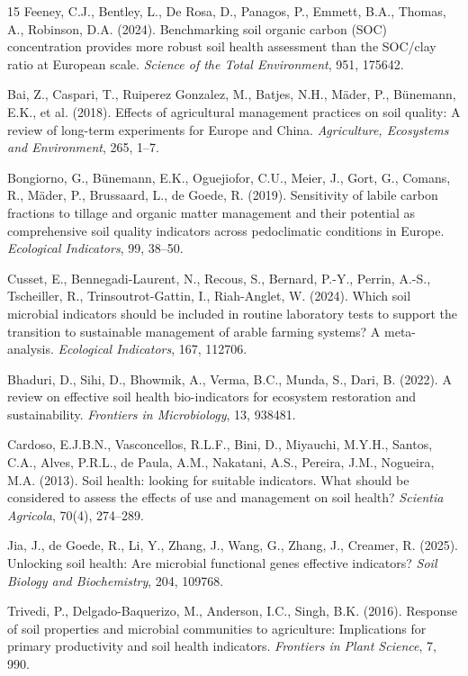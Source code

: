 \documentclass[11pt,a4paper]{article}
\begin{document}
\begin{thebibliography}{15}
Feeney, C.J., Bentley, L., De Rosa, D., Panagos, P., Emmett, B.A., Thomas, A.,
Robinson, D.A. (2024). Benchmarking soil organic carbon (SOC) concentration
provides more robust soil health assessment than the SOC/clay ratio at European
scale. \emph{Science of the Total Environment}, 951, 175642.

Bai, Z., Caspari, T., Ruiperez Gonzalez, M., Batjes, N.H., Mäder, P.,
Bünemann, E.K., et al. (2018). Effects of agricultural management practices on
soil quality: A review of long-term experiments for Europe and China.
\emph{Agriculture, Ecosystems and Environment}, 265, 1--7.

Bongiorno, G., Bünemann, E.K., Oguejiofor, C.U., Meier, J., Gort, G., Comans, R.,
Mäder, P., Brussaard, L., de Goede, R. (2019). Sensitivity of labile carbon
fractions to tillage and organic matter management and their potential as
comprehensive soil quality indicators across pedoclimatic conditions in Europe.
\emph{Ecological Indicators}, 99, 38--50.

Cusset, E., Bennegadi-Laurent, N., Recous, S., Bernard, P.-Y., Perrin, A.-S.,
Tscheiller, R., Trinsoutrot-Gattin, I., Riah-Anglet, W. (2024). Which soil
microbial indicators should be included in routine laboratory tests to support
the transition to sustainable management of arable farming systems?
A meta-analysis. \emph{Ecological Indicators}, 167, 112706.

Bhaduri, D., Sihi, D., Bhowmik, A., Verma, B.C., Munda, S., Dari, B. (2022).
A review on effective soil health bio-indicators for ecosystem restoration and
sustainability. \emph{Frontiers in Microbiology}, 13, 938481.

Cardoso, E.J.B.N., Vasconcellos, R.L.F., Bini, D., Miyauchi, M.Y.H.,
Santos, C.A., Alves, P.R.L., de Paula, A.M., Nakatani, A.S., Pereira, J.M.,
Nogueira, M.A. (2013). Soil health: looking for suitable indicators. What
should be considered to assess the effects of use and management on soil
health? \emph{Scientia Agricola}, 70(4), 274--289.

Jia, J., de Goede, R., Li, Y., Zhang, J., Wang, G., Zhang, J., Creamer, R.
(2025). Unlocking soil health: Are microbial functional genes effective
indicators? \emph{Soil Biology and Biochemistry}, 204, 109768.

Trivedi, P., Delgado-Baquerizo, M., Anderson, I.C., Singh, B.K. (2016).
Response of soil properties and microbial communities to agriculture:
Implications for primary productivity and soil health indicators.
\emph{Frontiers in Plant Science}, 7, 990.


\end{thebibliography}
\end{document}
